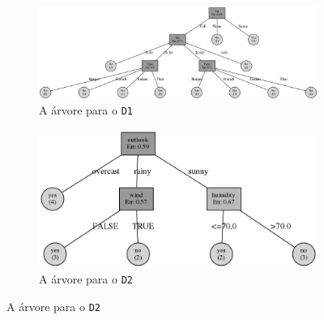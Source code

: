 \documentclass[12pt,a4paper,oneside]{article}
\begin{document}
\begin{figure}[!htb]
  \centering
  \begin{subfigure}[b]{0.90\textwidth}
    \centering
    \includegraphics[scale=0.2]{arv1}
    \caption{A árvore para o \texttt{D1}}
    \label{fig:ad1}
  \end{subfigure}
  
  \begin{subfigure}[b]{0.90\textwidth}
    \centering
    \includegraphics[scale=0.3]{arv2}
    \caption{A árvore para o \texttt{D2}}
    \label{fig:ad2}
  \end{subfigure}


\end{figure}
\end{document}
